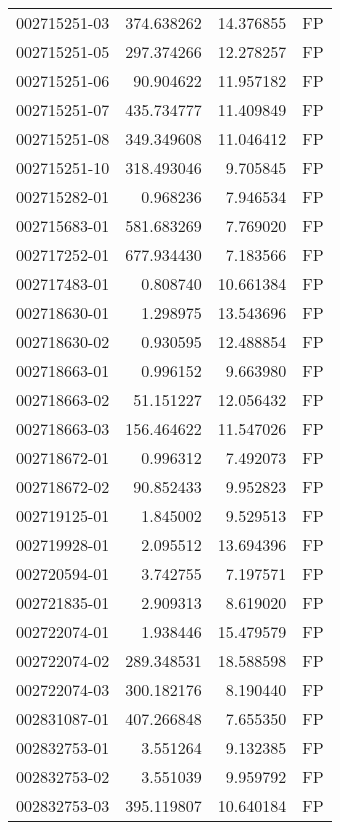 \begin{tabular}{lrrl}
002715251-03 &  374.638262 &      14.376855 &   FP \\
002715251-05 &  297.374266 &      12.278257 &   FP \\
002715251-06 &   90.904622 &      11.957182 &   FP \\
002715251-07 &  435.734777 &      11.409849 &   FP \\
002715251-08 &  349.349608 &      11.046412 &   FP \\
002715251-10 &  318.493046 &       9.705845 &   FP \\
002715282-01 &    0.968236 &       7.946534 &   FP \\
002715683-01 &  581.683269 &       7.769020 &   FP \\
002717252-01 &  677.934430 &       7.183566 &   FP \\
002717483-01 &    0.808740 &      10.661384 &   FP \\
002718630-01 &    1.298975 &      13.543696 &   FP \\
002718630-02 &    0.930595 &      12.488854 &   FP \\
002718663-01 &    0.996152 &       9.663980 &   FP \\
002718663-02 &   51.151227 &      12.056432 &   FP \\
002718663-03 &  156.464622 &      11.547026 &   FP \\
002718672-01 &    0.996312 &       7.492073 &   FP \\
002718672-02 &   90.852433 &       9.952823 &   FP \\
002719125-01 &    1.845002 &       9.529513 &   FP \\
002719928-01 &    2.095512 &      13.694396 &   FP \\
002720594-01 &    3.742755 &       7.197571 &   FP \\
002721835-01 &    2.909313 &       8.619020 &   FP \\
002722074-01 &    1.938446 &      15.479579 &   FP \\
002722074-02 &  289.348531 &      18.588598 &   FP \\
002722074-03 &  300.182176 &       8.190440 &   FP \\
002831087-01 &  407.266848 &       7.655350 &   FP \\
002832753-01 &    3.551264 &       9.132385 &   FP \\
002832753-02 &    3.551039 &       9.959792 &   FP \\
002832753-03 &  395.119807 &      10.640184 &   FP \\

\end{tabular}
